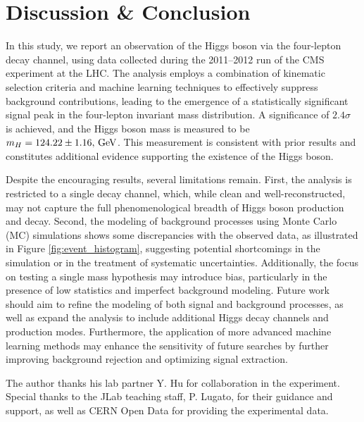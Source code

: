 \documentclass[aps,twocolumn,secnumarabic,balancelastpage,amsmath,amssymb,nofootinbib,floatfix]{revtex4-1}
\newcommand{\GeV}{\,{\rm GeV}}
\begin{document}
\section{Discussion \& Conclusion}
\label{sec:discussion}

In this study, we report an observation of the Higgs boson via the four-lepton decay channel, using data collected during the 2011–2012 run of the CMS experiment at the LHC. The analysis employs a combination of kinematic selection criteria and machine learning techniques to effectively suppress background contributions, leading to the emergence of a statistically significant signal peak in the four-lepton invariant mass distribution. A significance of $2.4\sigma$ is achieved, and the Higgs boson mass is measured to be $m_H = 124.22 \pm 1.16,\GeV$. This measurement is consistent with prior results and constitutes additional evidence supporting the existence of the Higgs boson.

Despite the encouraging results, several limitations remain. First, the analysis is restricted to a single decay channel, which, while clean and well-reconstructed, may not capture the full phenomenological breadth of Higgs boson production and decay. Second, the modeling of background processes using Monte Carlo (MC) simulations shows some discrepancies with the observed data, as illustrated in Figure \ref{fig:event_histogram}, suggesting potential shortcomings in the simulation or in the treatment of systematic uncertainties. Additionally, the focus on testing a single mass hypothesis may introduce bias, particularly in the presence of low statistics and imperfect background modeling. Future work should aim to refine the modeling of both signal and background processes, as well as expand the analysis to include additional Higgs decay channels and production modes. Furthermore, the application of more advanced machine learning methods may enhance the sensitivity of future searches by further improving background rejection and optimizing signal extraction.


\begin{acknowledgments}

The author thanks his lab partner Y. Hu for collaboration in the experiment. Special thanks to the JLab teaching staff, P. Lugato, for their guidance and support, as well as CERN Open Data for providing the experimental data.

\end{acknowledgments}




\end{document}
